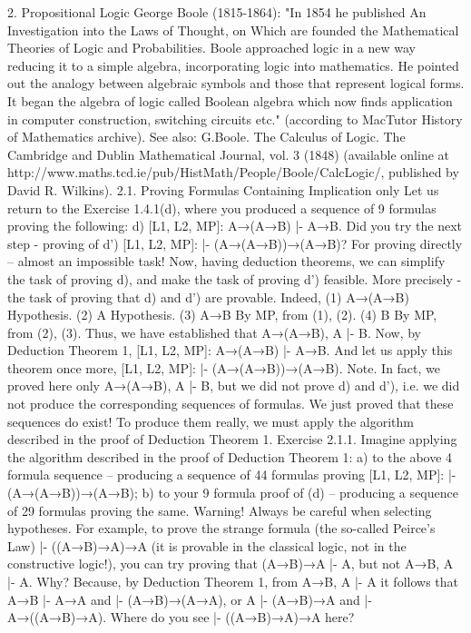 2. Propositional Logic
George Boole (1815-1864): "In 1854 he published An Investigation into the Laws of Thought, on Which are founded the
Mathematical Theories of Logic and Probabilities. Boole approached logic in a new way reducing it to a simple algebra,
incorporating logic into mathematics. He pointed out the analogy between algebraic symbols and those that represent logical
forms. It began the algebra of logic called Boolean algebra which now finds application in computer construction, switching
circuits etc." (according to MacTutor History of Mathematics archive).
See also:
G.Boole. The Calculus of Logic. The Cambridge and Dublin Mathematical Journal, vol. 3 (1848) (available online at
http://www.maths.tcd.ie/pub/HistMath/People/Boole/CalcLogic/, published by David R. Wilkins).
2.1. Proving Formulas Containing Implication only
Let us return to the Exercise 1.4.1(d), where you produced a sequence of 9 formulas proving the
following:
d) [L1, L2, MP]: A→(A→B) |- A→B.
Did you try the next step - proving of
d') [L1, L2, MP]: |- (A→(A→B))→(A→B)?
For proving directly – almost an impossible task!
Now, having deduction theorems, we can simplify the task of proving d), and make the task of proving d')
feasible. More precisely - the task of proving that d) and d') are provable. Indeed,
(1) A→(A→B) Hypothesis.
(2) A Hypothesis.
(3) A→B By MP, from (1), (2).
(4) B By MP, from (2), (3).
Thus, we have established that A→(A→B), A |- B. Now, by Deduction Theorem 1,
[L1, L2, MP]: A→(A→B) |- A→B.
And let us apply this theorem once more,
[L1, L2, MP]: |- (A→(A→B))→(A→B).
Note. In fact, we proved here only A→(A→B), A |- B, but we did not prove d) and d'), i.e. we did not
produce the corresponding sequences of formulas. We just proved that these sequences do exist! To
produce them really, we must apply the algorithm described in the proof of Deduction Theorem 1.
Exercise 2.1.1. Imagine applying the algorithm described in the proof of Deduction Theorem 1: a) to the
above 4 formula sequence – producing a sequence of 44 formulas proving [L1, L2, MP]: |-
(A→(A→B))→(A→B); b) to your 9 formula proof of (d) – producing a sequence of 29 formulas proving
the same.
Warning! Always be careful when selecting hypotheses. For example, to prove the strange
formula (the so-called Peirce's Law) |- ((A→B)→A)→A (it is provable in the classical logic, not in the
constructive logic!), you can try proving that (A→B)→A |- A, but not A→B, A |- A. Why? Because, by
Deduction Theorem 1, from A→B, A |- A it follows that A→B |- A→A and |- (A→B)→(A→A), or A |-
(A→B)→A and |- A→((A→B)→A). Where do you see |- ((A→B)→A)→A here?
